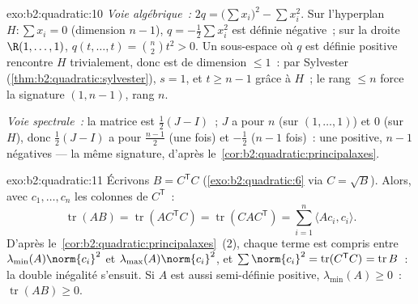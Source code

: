 \begin{solution}{exo:b2:quadratic:10}
\emph{Voie algébrique~:} $2q = \bigl(\sum x_i\bigr)^2 - \sum
x_i^2$. Sur l'hyperplan $H : \sum x_i = 0$ (dimension $n -
1$), $q = -\frac12\sum x_i^2$ est définie négative~; sur la droite
$\R(1, \dots, 1)$, $q(t, \dots, t) = \binom n2 t^2 > 0$. Un
sous-espace où $q$ est définie positive rencontre $H$ trivialement,
donc est de dimension $\leq 1$~: par Sylvester
(\cref{thm:b2:quadratic:sylvester}), $s = 1$, et $t \geq n-1$
grâce à $H$~; le rang $\leq n$ force la signature $(1, n-1)$, rang
$n$.

\emph{Voie spectrale~:} la matrice est $\frac12(J - I)$~; $J$ a pour
 $n$ (sur $(1,\dots,1)$) et $0$ (sur $H$), donc
$\frac12(J-I)$ a pour  $\frac{n-1}{2}$ (une fois) et
$-\frac12$ ($n-1$ fois)~: une positive, $n-1$ négatives --- la même
signature, d'après le~\cref{cor:b2:quadratic:principalaxes}.
\end{solution}

\begin{solution}{exo:b2:quadratic:11}
Écrivons $B = C^{\mathsf T}C$ (\cref{exo:b2:quadratic:6} via $C =
\sqrt B$). Alors, avec $c_1, \dots, c_n$ les colonnes de
$C^{\mathsf T}$~:
\[
\operatorname{tr}(AB) = \operatorname{tr}(AC^{\mathsf T}C)
= \operatorname{tr}(CAC^{\mathsf T})
= \sum_{i=1}^n \langle A c_i, c_i\rangle .
\]
D'après le~\cref{cor:b2:quadratic:principalaxes}~(2), chaque terme
est compris entre $\lambda_{\min}(A)\norm{c_i}^2$ et
$\lambda_{\max}(A)\norm{c_i}^2$, et $\sum\norm{c_i}^2 =
\operatorname{tr}(C^{\mathsf T}C)^{\vphantom1} =
\operatorname{tr} B$~: la double inégalité s'ensuit. Si $A$ est
aussi semi-définie positive, $\lambda_{\min}(A) \geq 0$~:
$\operatorname{tr}(AB) \geq 0$.
\end{solution}

